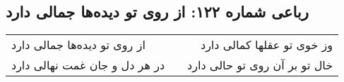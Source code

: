 \begin{center}
\section*{رباعی شماره ۱۲۲: از روی تو دیده‌ها جمالی دارد}
\label{sec:sh122}
\begin{longtable}{l p{0.5cm} r}
از روی تو دیده‌ها جمالی دارد
&&
وز خوی تو عقلها کمالی دارد
\\
در هر دل و جان غمت نهالی دارد
&&
خال تو بر آن روی تو حالی دارد
\\
\end{longtable}
\end{center}
